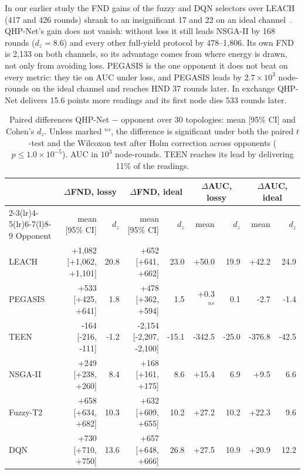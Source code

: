 \documentclass[conference]{IEEEtran}
\begin{document}
In our earlier study the FND gains of the fuzzy and DQN selectors over LEACH (417 and 426 rounds) shrank to an insignificant 17 and 22 on an ideal channel~\cite{sharma2026unified}. QHP-Net's gain does not vanish: without loss it still leads NSGA-II by 168 rounds ($d_z=8.6$) and every other full-yield protocol by 478--1,806. Its own FND is 2,133 on both channels, so its advantage comes from where energy is drawn, not only from avoiding loss. PEGASIS is the one opponent it does not beat on every metric: they tie on AUC under loss, and PEGASIS leads by $2.7\times10^3$ node-rounds on the ideal channel and reaches HND 37 rounds later. In exchange QHP-Net delivers 15.6 points more readings and its first node dies 533 rounds later.

\begin{table}[t]
\caption{Paired differences QHP-Net $-$ opponent over 30 topologies: mean [95\% CI] and Cohen's $d_z$. Unless marked $^{ns}$, the difference is significant under both the paired $t$-test and the Wilcoxon test after Holm correction across opponents ($p\le1.0\times10^{-5}$). AUC in $10^3$ node-rounds. TEEN reaches its lead by delivering 11\% of the readings.}
\label{tab:ttest}
\centering\footnotesize
\begin{tabular}{@{}lrrrrrrrr@{}}
\toprule
& \multicolumn{2}{c}{$\Delta$FND, lossy} & \multicolumn{2}{c}{$\Delta$FND, ideal} & \multicolumn{2}{c}{$\Delta$AUC, lossy} & \multicolumn{2}{c}{$\Delta$AUC, ideal}\\
\cmidrule(lr){2-3}\cmidrule(lr){4-5}\cmidrule(lr){6-7}\cmidrule(l){8-9}
Opponent & mean [95\% CI] & $d_z$ & mean [95\% CI] & $d_z$ & mean & $d_z$ & mean & $d_z$\\
\midrule
LEACH & +1,082 [+1,062, +1,101] & 20.8 & +652 [+641, +662] & 23.0 & +50.0 & 19.9 & +42.2 & 24.9 \\
PEGASIS & +533 [+425, +641] & 1.8 & +478 [+362, +594] & 1.5 & +0.3$^{ns}$ & 0.1 & -2.7 & -1.4 \\
TEEN & -164 [-216, -111] & -1.2 & -2,154 [-2,207, -2,100] & -15.1 & -342.5 & -25.0 & -376.8 & -42.5 \\
NSGA-II & +249 [+238, +260] & 8.4 & +168 [+161, +175] & 8.6 & +15.4 & 6.9 & +9.5 & 6.6 \\
Fuzzy-T2 & +658 [+634, +682] & 10.3 & +632 [+609, +655] & 10.2 & +27.2 & 10.2 & +22.3 & 9.6 \\
DQN & +730 [+710, +750] & 13.6 & +657 [+648, +666] & 26.8 & +27.5 & 10.9 & +20.9 & 12.2 \\
\bottomrule
\end{tabular}
\end{table}
\end{document}
